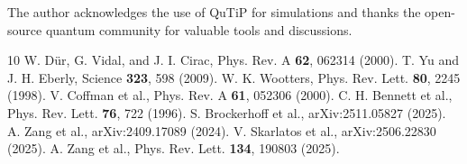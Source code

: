 \documentclass[apl, twocolumn, superscriptaddress, showpacs, floatfix]{revtex4-2}
\begin{document}
\begin{acknowledgments}
The author acknowledges the use of QuTiP for simulations and thanks the open-source quantum community for valuable tools and discussions.
\end{acknowledgments}

\begin{thebibliography}{10}
 W. D\"ur, G. Vidal, and J. I. Cirac, Phys. Rev. A \textbf{62}, 062314 (2000).
 T. Yu and J. H. Eberly, Science \textbf{323}, 598 (2009).
 W. K. Wootters, Phys. Rev. Lett. \textbf{80}, 2245 (1998).
 V. Coffman et al., Phys. Rev. A \textbf{61}, 052306 (2000).
 C. H. Bennett et al., Phys. Rev. Lett. \textbf{76}, 722 (1996).
 S. Brockerhoff et al., arXiv:2511.05827 (2025).
 A. Zang et al., arXiv:2409.17089 (2024).
 V. Skarlatos et al., arXiv:2506.22830 (2025).
 A. Zang et al., Phys. Rev. Lett. \textbf{134}, 190803 (2025).
\end{thebibliography}
\end{document}
